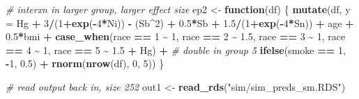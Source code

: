 \documentclass[12pt, twoside]{amherstthesis}
\newenvironment{Shaded}{\begin{snugshade}}{\end{snugshade}}
\newcommand{\AttributeTok}[1]{\textcolor[rgb]{0.13,0.29,0.53}{#1}}
\newcommand{\CommentTok}[1]{\textcolor[rgb]{0.56,0.35,0.01}{\textit{#1}}}
\newcommand{\ControlFlowTok}[1]{\textcolor[rgb]{0.13,0.29,0.53}{\textbf{#1}}}
\newcommand{\DecValTok}[1]{\textcolor[rgb]{0.00,0.00,0.81}{#1}}
\newcommand{\FloatTok}[1]{\textcolor[rgb]{0.00,0.00,0.81}{#1}}
\newcommand{\FunctionTok}[1]{\textcolor[rgb]{0.13,0.29,0.53}{\textbf{#1}}}
\newcommand{\NormalTok}[1]{#1}
\newcommand{\OtherTok}[1]{\textcolor[rgb]{0.56,0.35,0.01}{#1}}
\newcommand{\SpecialCharTok}[1]{\textcolor[rgb]{0.81,0.36,0.00}{\textbf{#1}}}
\newcommand{\StringTok}[1]{\textcolor[rgb]{0.31,0.60,0.02}{#1}}
\begin{document}
\begin{Shaded}
\begin{Highlighting}[]
\CommentTok{\# interxn in larger group, larger effect size}
\NormalTok{ep2 }\OtherTok{\textless{}{-}} \ControlFlowTok{function}\NormalTok{(df) \{}
  \FunctionTok{mutate}\NormalTok{(df, }\AttributeTok{y =} 
\NormalTok{           Hg }\SpecialCharTok{+} \DecValTok{3}\SpecialCharTok{/}\NormalTok{(}\DecValTok{1}\SpecialCharTok{+}\FunctionTok{exp}\NormalTok{(}\SpecialCharTok{{-}}\DecValTok{4}\SpecialCharTok{*}\NormalTok{Ni)) }\SpecialCharTok{{-}}\NormalTok{ (Sb}\SpecialCharTok{\^{}}\DecValTok{2}\NormalTok{) }\SpecialCharTok{+} \FloatTok{0.5}\SpecialCharTok{*}\NormalTok{Sb }\SpecialCharTok{+} \FloatTok{1.5}\SpecialCharTok{/}\NormalTok{(}\DecValTok{1}\SpecialCharTok{+}\FunctionTok{exp}\NormalTok{(}\SpecialCharTok{{-}}\DecValTok{4}\SpecialCharTok{*}\NormalTok{Sn)) }\SpecialCharTok{+} 
\NormalTok{           age }\SpecialCharTok{+} \FloatTok{0.5}\SpecialCharTok{*}\NormalTok{bmi }\SpecialCharTok{+} 
           \FunctionTok{case\_when}\NormalTok{(race }\SpecialCharTok{==} \DecValTok{1} \SpecialCharTok{\textasciitilde{}} \DecValTok{1}\NormalTok{, }
\NormalTok{                     race }\SpecialCharTok{==} \DecValTok{2} \SpecialCharTok{\textasciitilde{}} \FloatTok{1.5}\NormalTok{, }
\NormalTok{                     race }\SpecialCharTok{==} \DecValTok{3} \SpecialCharTok{\textasciitilde{}} \DecValTok{1}\NormalTok{, }
\NormalTok{                     race }\SpecialCharTok{==} \DecValTok{4} \SpecialCharTok{\textasciitilde{}} \DecValTok{1}\NormalTok{, }
\NormalTok{                     race }\SpecialCharTok{==} \DecValTok{5} \SpecialCharTok{\textasciitilde{}} \FloatTok{1.5} \SpecialCharTok{+}\NormalTok{ Hg) }\SpecialCharTok{+} \CommentTok{\# double in group 5}
           \FunctionTok{ifelse}\NormalTok{(smoke }\SpecialCharTok{==} \DecValTok{1}\NormalTok{, }\SpecialCharTok{{-}}\DecValTok{1}\NormalTok{, }\FloatTok{0.5}\NormalTok{) }\SpecialCharTok{+}
           \FunctionTok{rnorm}\NormalTok{(}\FunctionTok{nrow}\NormalTok{(df), }\DecValTok{0}\NormalTok{, }\DecValTok{5}\NormalTok{))}
\NormalTok{\}}

\CommentTok{\# read output back in, size 252}
\NormalTok{out1 }\OtherTok{\textless{}{-}} \FunctionTok{read\_rds}\NormalTok{(}\StringTok{"sim/sim\_preds\_sm.RDS"}\NormalTok{)}


\end{Highlighting}
\end{Shaded}
\end{document}
